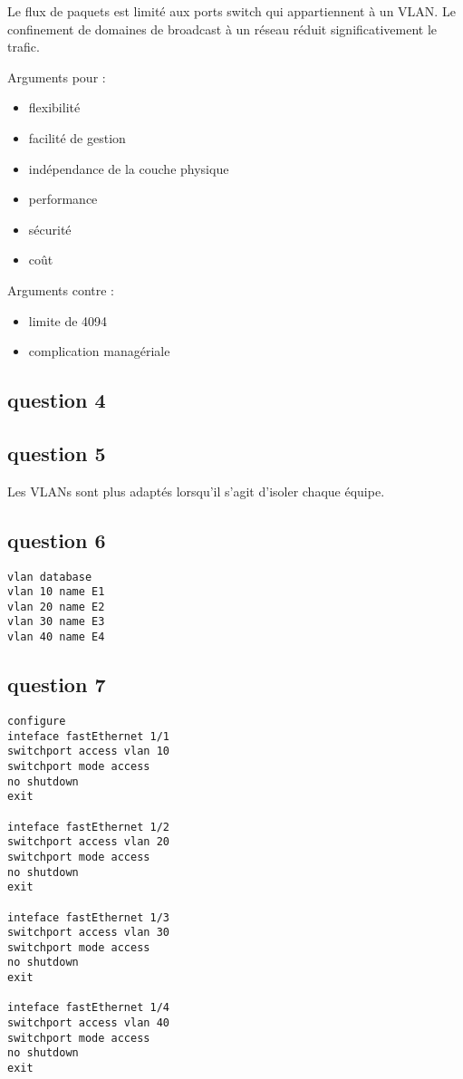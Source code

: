 \documentclass[11pt]{article}
\begin{document}
Le flux de paquets est limité aux ports switch qui appartiennent à un VLAN.
Le confinement de domaines de broadcast à un réseau réduit significativement le trafic.




Arguments pour :
\begin{itemize}
\item flexibilité
\item facilité de gestion
\item indépendance de la couche physique
\item performance
\item sécurité
\item coût
\end{itemize}

Arguments contre :
\begin{itemize}
\item limite de 4094
\item complication managériale
\end{itemize}


\subsection{question 4}
\label{sec:orgheadline20}

\subsection{question 5}
\label{sec:orgheadline21}

Les VLANs sont plus adaptés lorsqu'il s'agit d'isoler chaque équipe.



\subsection{question 6}
\label{sec:orgheadline22}

\begin{verbatim}
vlan database
vlan 10 name E1
vlan 20 name E2
vlan 30 name E3
vlan 40 name E4
\end{verbatim}
\subsection{question 7}
\label{sec:orgheadline23}

\begin{verbatim}
configure
inteface fastEthernet 1/1
switchport access vlan 10
switchport mode access
no shutdown
exit

inteface fastEthernet 1/2
switchport access vlan 20
switchport mode access
no shutdown
exit

inteface fastEthernet 1/3
switchport access vlan 30
switchport mode access
no shutdown
exit

inteface fastEthernet 1/4
switchport access vlan 40
switchport mode access
no shutdown
exit
\end{verbatim}
\end{document}
